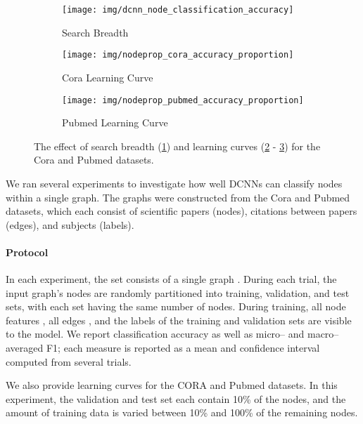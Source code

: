 \documentclass{article}
\newcommand{\subfigwidth}{0.3\textwidth}
\begin{document}
\begin{figure}[t]
    \centering
    \begin{subfigure}[t]{\subfigwidth}
        \centering
        \texttt{[image: img/dcnn\_node\_classification\_accuracy]}
        \caption{Search Breadth}
        \label{fig:nodesearchbreadth}
    \end{subfigure}
    \begin{subfigure}[t]{\subfigwidth}
        \centering
        \texttt{[image: img/nodeprop\_cora\_accuracy\_proportion]}
        \caption{Cora Learning Curve}
        \label{fig:nodeclasscoraprop}
    \end{subfigure}
    \begin{subfigure}[t]{\subfigwidth}
        \centering
        \texttt{[image: img/nodeprop\_pubmed\_accuracy\_proportion]}
        \caption{Pubmed Learning Curve}
        \label{fig:nodeclasspubmedprop}
    \end{subfigure}
    \caption{The effect of search breadth (\ref{fig:nodesearchbreadth}) and learning curves (\ref{fig:nodeclasscoraprop} - \ref{fig:nodeclasspubmedprop})  for the Cora and Pubmed datasets.}
    \label{fig:nodeclass}
\end{figure}

We ran several experiments to investigate how well DCNNs can classify nodes within a single graph.  The graphs were constructed from the Cora and Pubmed datasets, which each consist of scientific papers (nodes), citations between papers (edges), and subjects (labels).

\paragraph{Protocol} In each experiment, the set  consists of a single graph .  During each trial, the input graph's nodes are randomly partitioned into training, validation, and test sets, with each set having the same number of nodes.  During training, all node features , all edges , and the labels  of the training and validation sets are visible to the model. We report classification accuracy as well as micro-- and macro--averaged F1; each measure is reported as a mean and confidence interval computed from several trials.

We also provide learning curves for the CORA and Pubmed datasets.  In this experiment, the validation and test set each contain 10\% of the nodes, and the amount of training data is varied between 10\% and 100\% of the remaining nodes.
\end{document}
